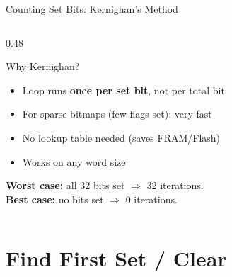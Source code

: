 \documentclass[aspectratio=169, 10pt]{beamer}
\begin{document}
\begin{frame}[fragile]{Counting Set Bits: Kernighan's Method}
\begin{columns}[T]
\begin{column}{0.48\textwidth}
\vspace{0.5em}
\begin{block}{Why Kernighan?}
\begin{itemize}
  \item Loop runs \textbf{once per set bit}, not per total bit
  \item For sparse bitmaps (few flags set): very fast
  \item No lookup table needed (saves FRAM/Flash)
  \item Works on any word size
\end{itemize}
\end{block}

\textbf{Worst case:} all 32 bits set $\Rightarrow$ 32 iterations.\\
\textbf{Best case:} no bits set $\Rightarrow$ 0 iterations.
\end{column}
\end{columns}
\end{frame}

\section{Find First Set / Clear}
\end{document}
